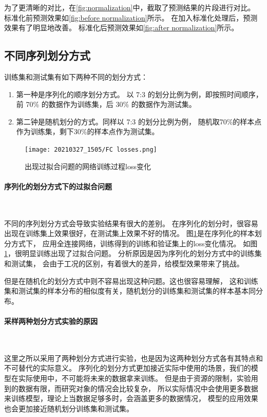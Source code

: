   为了更清晰的对比，在\ref{fig:normalization}中，截取了预测结果的片段进行对比。
  标准化前预测效果如\ref{fig:before normalization}所示。
  在加入标准化处理后，预测效果有了明显地改善。
  标准化后预测效果如\ref{fig:after normalization}所示。

  \subsection{不同序列划分方式}\label{subsection_diffrent_divide}
    训练集和测试集有如下两种不同的划分方式：
    \begin{enumerate}
      \item 第一种是序列化的顺序划分方式。
      以 7:3 的划分比例为例，即按照时间顺序，前 70\% 的数据作为训练集，后 30\% 的数据作为测试集。
      \item 第二钟是随机划分的方式。同样以 7:3 的划分比例为例，
      随机取70\%的样本点作为训练集，剩下30\%的样本点作为测试集。
    \end{enumerate}

    \begin{figure}
      \centering
      \texttt{[image: 20210327\_1505/FC losses.png]}
      \caption{出现过拟合问题的网络训练过程loss变化}
      \label{fig:overfit FC}
    \end{figure}
    
    \paragraph{序列化的划分方式下的过拟合问题}~{}

    不同的序列划分方式会导致实验结果有很大的差别。
    在序列化的划分时，很容易出现在训练集上效果很好，在测试集上效果不好的情况。
    图\ref{fig:overfit FC}是在序列化的样本划分方式下，
    应用全连接网络，训练得到的训练和验证集上的loss变化情况。
    如图\ref{fig:overfit FC}，很明显训练出现了过拟合问题。
    分析原因是因为序列化的划分方式中的训练集和测试集，
    会由于工况的区别，有着很大的差异，给模型效果带来了挑战。

    但是在随机化的划分方式中则不容易出现这种问题。这也很容易理解，
    这和训练集和测试集的样本分布的相似度有关，随机划分的训练集和测试集的样本基本同分布。

    \paragraph{采样两种划分方式实验的原因}~{}

    这里之所以采用了两种划分方式进行实验，也是因为这两种划分方式各有其特点和不可替代的实际意义。
    序列化的划分方式更加接近实际中使用的场景，我们的模型在实际使用中，不可能将未来的数据拿来训练。
    但是由于资源的限制，实验用到的数据有限，而研究对象的情况会比较复杂，
    所以实际情况中会使用更多数据来训练模型，理论上当数据足够多时，会涵盖更多的数据情况，
    模型的应用效果也会更加接近随机划分训练集和测试集。


